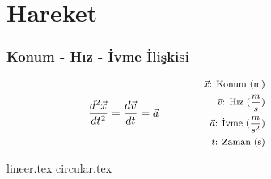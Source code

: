 \section{Hareket}

\subsubsection*{Konum - Hız - İvme İlişkisi}
\begin{equation}
    \frac{d^2 \vec{x}}{dt^2} = \frac{d\vec{v}}{dt} = \vec{a} \qquad \qquad \parbox{4cm}{\footnotesize$\begin{aligned}
        \vec{x}\text{: Konum (m)} \\
        \vec{v}\text{: Hız } (\frac{m}{s}) \\
        \vec{a}\text{: İvme } (\frac{m}{s^2}) \\
        t\text{: Zaman (s)}
\end{aligned}$}
\end{equation}

{lineer.tex}
{circular.tex}
